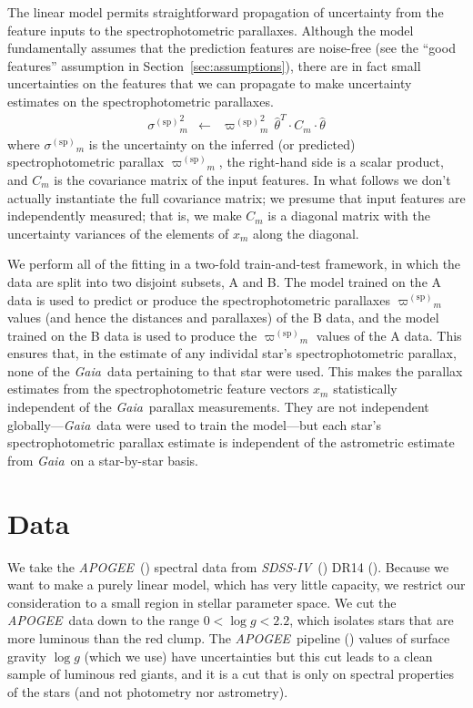\documentclass[modern]{aastex62}
\newcommand{\sectionname}{Section}
\newcommand{\acronym}[1]{{\small{#1}}}
\newcommand{\project}[1]{\textsl{#1}}
\newcommand{\apogee}{\project{\acronym{APOGEE}}}
\newcommand{\gaia}{\project{Gaia}}
\newcommand{\sdssiv}{\project{\acronym{SDSS-IV}}}
\newcommand{\logg}{\log g}
\newcommand{\sparallax}{{\varpi^{(\mathrm{sp})}}}
\newcommand{\ssigma}{{\sigma^{(\mathrm{sp})}}}
\begin{document}
The linear model permits straightforward propagation of uncertainty from the
feature inputs to the spectrophotometric parallaxes.
Although the model fundamentally assumes that the prediction features are noise-free
(see the ``good features'' assumption in \sectionname~\ref{sec:assumptions}),
there are in fact small uncertainties on the features that we can propagate to 
make uncertainty estimates on the spectrophotometric parallaxes.
\begin{eqnarray}
\ssigma_m^2 &\leftarrow& \sparallax_m^2\,\hat{\theta}^T\cdot C_m\cdot\hat{\theta}
\label{eq:unc}
\end{eqnarray}
where $\ssigma_m$ is the uncertainty on the inferred (or predicted)
spectrophotometric parallax $\sparallax_m$,
the right-hand side is a scalar product,
and $C_m$ is the covariance matrix of the input
features.
In what follows we don't actually instantiate the full covariance matrix; we presume
that input features are independently measured;
that is, we make $C_m$ is a diagonal matrix with the uncertainty variances of the elements
of $x_m$ along the diagonal.

We perform all of the fitting in a two-fold train-and-test framework,
in which the data are split into two disjoint subsets, A and B.
The model trained on the A data is used to predict or produce
the spectrophotometric parallaxes $\sparallax_m$ values (and hence
the distances and parallaxes) of the B data,
and the model trained on the B data is used to 
produce the $\sparallax_m$ values of the A data.
This ensures that, in the estimate of any individal star's
spectrophotometric parallax, none of the \gaia\ data pertaining to that star were used.
This makes the parallax estimates from the spectrophotometric feature vectors
$x_m$ statistically independent of the \gaia\ parallax measurements.
They are not independent globally---\gaia\ data were used to train the model---but
each star's spectrophotometric parallax estimate is independent
of the astrometric estimate from \gaia\ on a star-by-star basis.

\section{Data}

We take the \apogee\ (\citealt{aapogee, wapogee, apogee}) spectral data
from \sdssiv\ (\citealt{sdssiv}) \acronym{DR14} (\citealt{dr14}).
Because we want to make a purely linear model, which has very little capacity,
we restrict our consideration to a small region in stellar parameter space.
We cut the \apogee\ data down to the range $0<\logg<2.2$, which isolates
stars that are more luminous than the red clump.
The \apogee\ pipeline (\citealt{aspcap})
values of surface gravity $\logg$ (which we use) have uncertainties but
this cut leads to a clean sample of luminous red giants, and it is a cut
that is only on spectral properties of the stars (and not photometry nor astrometry).
\end{document}
